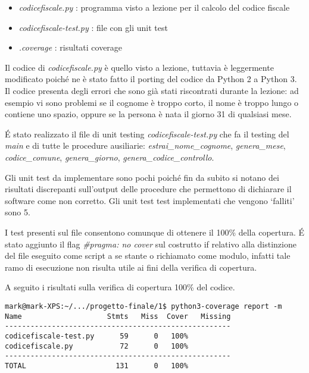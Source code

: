 \documentclass{article}
\newcommand{\py}{Python }
\newcommand{\pycode}[1]{\textit{#1}}
\newcommand{\filename}[1]{\textit{#1}}
\newcommand{\function}[1]{\textit{#1}}
\begin{document}
\begin{itemize}
    \item \filename{codicefiscale.py} : programma visto a lezione per il calcolo del codice fiscale 
    \item \filename{codicefiscale-test.py} : file con gli unit test
    \item \filename{.coverage} : risultati coverage
\end{itemize}

Il codice di \filename{codicefiscale.py} è quello visto a lezione, tuttavia è leggermente modificato poiché ne è stato fatto il porting del codice da \py 2 a \py 3. Il codice presenta degli errori che sono già stati riscontrati durante la lezione: ad esempio vi sono problemi se il cognome è troppo corto, il nome è troppo lungo o contiene uno spazio, oppure se la persona è nata il giorno 31 di qualsiasi mese.

\'E stato realizzato il file di unit testing \filename{codicefiscale-test.py} che fa il testing del \function{main} e di tutte le procedure ausiliarie: \function{estrai\_nome\_cognome}, \function{genera\_mese}, \function{codice\_comune}, \function{genera\_giorno}, \function{genera\_codice\_controllo}.

Gli unit test da implementare sono pochi poiché fin da subito si notano dei risultati discrepanti sull'output delle procedure che permettono di dichiarare il software come non corretto.
Gli unit test test implementati che vengono `falliti' sono 5.

I test presenti sul file consentono comunque di ottenere il 100\% della copertura. \'E stato aggiunto il flag \pycode{\#pragma: no cover} sul costrutto if relativo alla distinzione del file eseguito come script a se stante o richiamato come modulo, infatti tale ramo di esecuzione non risulta utile ai fini della verifica di copertura.

A seguito i risultati sulla verifica di copertura 100\% del codice.
\begin{verbatim}
mark@mark-XPS:~/.../progetto-finale/1$ python3-coverage report -m
Name                    Stmts   Miss  Cover   Missing
-----------------------------------------------------
codicefiscale-test.py      59      0   100%
codicefiscale.py           72      0   100%
-----------------------------------------------------
TOTAL                     131      0   100%
\end{verbatim}
\end{document}
